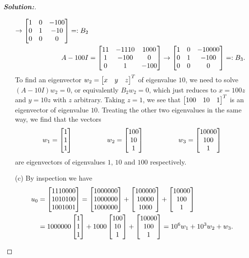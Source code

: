 \documentclass[a4paper]{amsart}
\theoremstyle{definition}
\newenvironment{solution}{\begin{proof}[\textbf{Solution:}] \vphantom{u}}{\end{proof}}
\begin{document}
\begin{solution}
\begin{itemize}
\begin{align*}
            \to \bbm 1 & 0 & -100 \\ 0 & 1 & -10 \\ 0 & 0 & 0 \ebm =: B_2\\
    A-100I &= \bbm 11 & -1110 & 1000 \\ 1 & -100 & 0 \\ 0 & 1 & -100 \ebm 
            \to \bbm 1 & 0 & -10000 \\ 0 & 1 & -100 \\ 0 & 0 & 0 \ebm =: B_3.
   \end{align*}
   To find an eigenvector $w_2=\bbm x & y & z\ebm^T$ of eigenvalue
   $10$, we need to solve $(A-10I)w_2=0$, or equivalently $B_2w_2=0$,
   which just reduces to $x=100z$ and $y=10z$ with $z$ arbitrary.
   Taking $z=1$, we see that $\bbm 100 & 10 & 1\ebm^T$ is an
   eigenvector of eigenvalue $10$.  Treating the other two eigenvalues
   in the same way, we find that the vectors
   \[ w_1 = \bbm 1 \\ 1 \\ 1 \ebm \hspace{5em}
      w_2 = \bbm 100 \\ 10 \\ 1 \ebm \hspace{5em}
      w_3 = \bbm 10000 \\ 100 \\ 1 \ebm
   \]
   are eigenvectors of eigenvalues $1$, $10$ and $100$ respectively.
  \item[(c)] By inspection we have
   \begin{align*}
    u_0 &= \left[\begin{matrix} 1110000 \\ 1010100 \\ 1001001\end{matrix}\right] 
       = \left[\begin{matrix} 1000000 \\ 1000000 \\ 1000000\end{matrix}\right] +
         \left[\begin{matrix}  100000 \\   10000 \\    1000\end{matrix}\right] +
         \left[\begin{matrix}   10000 \\     100 \\       1\end{matrix}\right]  \\
      &= 1000000 \left[\begin{matrix} 1 \\ 1 \\ 1\end{matrix}\right] +
         1000 \left[\begin{matrix} 100 \\ 10 \\ 1\end{matrix}\right] +
         \left[\begin{matrix} 10000 \\ 100 \\ 1\end{matrix}\right] 
       = 10^6 w_1 + 10^3 w_2 + w_3.
   \end{align*}

\end{itemize}
\end{solution}
\end{document}
